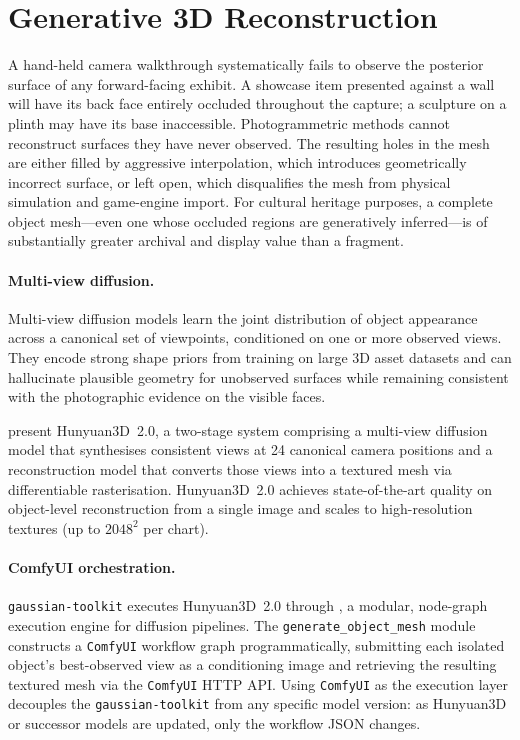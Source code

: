 \section{Generative 3D Reconstruction}\label{sec:generative}

A hand-held camera walkthrough systematically fails to observe the posterior
surface of any forward-facing exhibit. A showcase item presented against a wall
will have its back face entirely occluded throughout the capture; a sculpture on
a plinth may have its base inaccessible. Photogrammetric methods cannot reconstruct
surfaces they have never observed. The resulting holes in the mesh are either
filled by aggressive interpolation, which introduces geometrically incorrect
surface, or left open, which disqualifies the mesh from physical simulation and
game-engine import. For cultural heritage purposes, a complete object mesh---even
one whose occluded regions are generatively inferred---is of substantially greater
archival and display value than a fragment.

\paragraph{Multi-view diffusion.}
Multi-view diffusion models learn the joint distribution of object appearance
across a canonical set of viewpoints, conditioned on one or more observed views.
They encode strong shape priors from training on large 3D asset datasets and can
hallucinate plausible geometry for unobserved surfaces while remaining consistent
with the photographic evidence on the visible faces.

\textcite{Zhao2025Hunyuan} present Hunyuan3D~2.0, a two-stage system comprising
a multi-view diffusion model that synthesises consistent views at 24 canonical
camera positions and a reconstruction model that converts those views into a
textured mesh via differentiable rasterisation. Hunyuan3D~2.0 achieves state-of-the-art
quality on object-level reconstruction from a single image and scales to
high-resolution textures (up to $2048^2$ per chart).

\paragraph{ComfyUI orchestration.}
\texttt{gaussian-toolkit} executes Hunyuan3D~2.0 through \textcite{ComfyUI2024},
a modular, node-graph execution engine for diffusion pipelines. The \texttt{generate\_object\_mesh}
module constructs a \texttt{ComfyUI} workflow graph programmatically, submitting
each isolated object's best-observed view as a conditioning image and retrieving
the resulting textured mesh via the \texttt{ComfyUI} HTTP API. Using
\texttt{ComfyUI} as the execution layer decouples the \texttt{gaussian-toolkit}
from any specific model version: as Hunyuan3D or successor models are updated,
only the workflow JSON changes.

